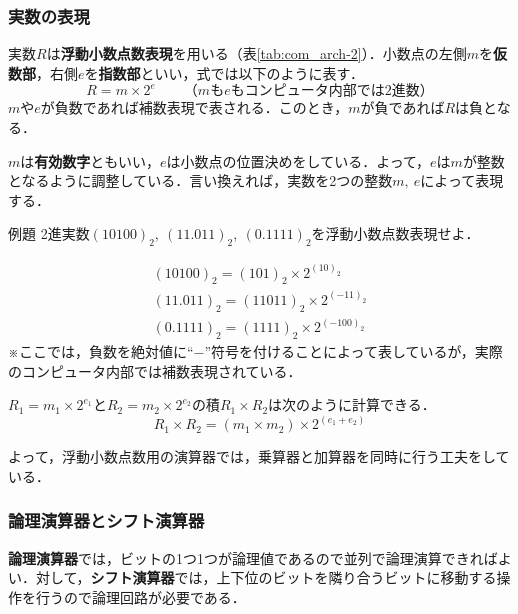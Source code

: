 \subsubsection{実数の表現}\label{sec:com_arch-2-C-7}

実数$R$は\textbf{浮動小数点数表現}を用いる（表\ref{tab:com_arch-2}）．小数点の左側$m$を\textbf{仮数部}，右側$e$を\textbf{指数部}といい，式では以下のように表す．
\begin{equation}
	R = m \times 2^e \qquad \text{（$m$も$e$もコンピュータ内部では2進数）}
\end{equation}
$m$や$e$が負数であれば補数表現で表される．このとき，$m$が負であれば$R$は負となる．

$m$は\textbf{有効数字}ともいい，$e$は小数点の位置決めをしている．よって，$e$は$m$が整数となるように調整している．言い換えれば，実数を2つの整数$m,\ e$によって表現する．

\begin{tip}{例題}
	\textsf{
		2進実数$(10100)_{2},\ (11.011)_{2},\ (0.1111)_{2}$を浮動小数点数表現せよ．
	}
	
	\tcblower

	\begin{gather*}
		(10100)_{2} = (101)_{2} \times 2^{(10)_{2}}\\
		(11.011)_{2} = (11011)_{2} \times 2^{(-11)_{2}}\\
		(0.1111)_{2} = (1111)_{2} \times 2^{(-100)_{2}}
	\end{gather*}
	※ここでは，負数を絶対値に“$-$”符号を付けることによって表しているが，実際のコンピュータ内部では補数表現されている．
\end{tip}

$R_1 = m_1 \times 2^{e_1}$と$R_2 = m_2 \times 2^{e_2}$の積$R_1 \times R_2$は次のように計算できる．
\begin{equation}
	R_1 \times R_2 = (m_1 \times m_2) \times 2^{(e_1 + e_2)}
\end{equation}

よって，浮動小数点数用の演算器では，乗算器と加算器を同時に行う工夫をしている．



\subsubsection{論理演算器とシフト演算器}\label{sec:com_arch-2-C-8}

\textbf{論理演算器}では，ビットの1つ1つが論理値であるので並列で論理演算できればよい．対して，\textbf{シフト演算器}では，上下位のビットを隣り合うビットに移動する操作を行うので論理回路が必要である．



